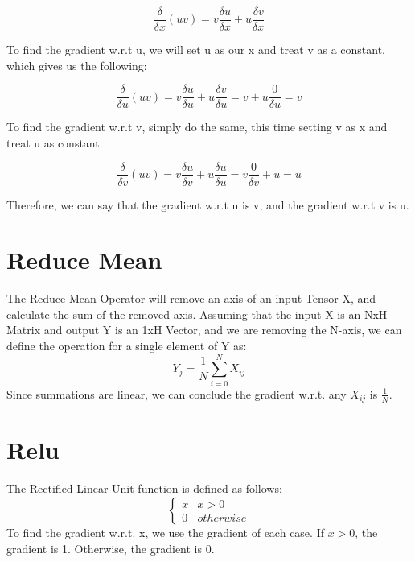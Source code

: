 \documentclass{article}
\begin{document}
        $$\frac{\delta}{\delta{x}}(uv) = v\frac{\delta{u}}{\delta{x}} + u\frac{\delta{v}}{\delta{x}}$$

        To find the gradient w.r.t u, we will set u as our x and treat v as a constant, 
        which gives us the following:

        $$\frac{\delta}{\delta{u}}(uv) = v\frac{\delta{u}}{\delta{u}} + u\frac{\delta{v}}{\delta{u}} = v + u\frac{0}{\delta{u}} = v$$

        To find the gradient w.r.t v, simply do the same, this time setting v as x and treat u as constant.

        $$\frac{\delta}{\delta{v}}(uv) = v\frac{\delta{u}}{\delta{v}} + u\frac{\delta{u}}{\delta{u}} = v\frac{0}{\delta{v}} + u = u$$

        Therefore, we can say that the gradient w.r.t u is v, and the gradient w.r.t v is u. 

\noindent\makebox[\linewidth]{\rule{\paperwidth}{0.4pt}}
    \section{Reduce Mean}
        The Reduce Mean Operator will remove an axis of an input Tensor X, and calculate the sum of the removed axis. Assuming that
        the input X is an NxH Matrix and output Y is an 1xH Vector, and we are removing the N-axis, we can define 
        the operation for a single element of Y as: 
        $$Y_j = \frac{1}{N} \sum_{i=0}^{N} X_{ij}$$
        Since summations are linear, we can conclude the gradient w.r.t. any $X_{ij}$ is $\frac{1}{N}$.

\noindent\makebox[\linewidth]{\rule{\paperwidth}{0.4pt}}
    \section{Relu}
        The Rectified Linear Unit function is defined as follows:
        \[ \begin{cases} 
            x & x > 0 \\
            0 & otherwise
        \end{cases}
        \]
        To find the gradient w.r.t. x, we use the gradient of each case. If $x > 0$, the gradient is 1. Otherwise, the gradient is 0.

\noindent\makebox[\linewidth]{\rule{\paperwidth}{0.4pt}}
\end{document}
